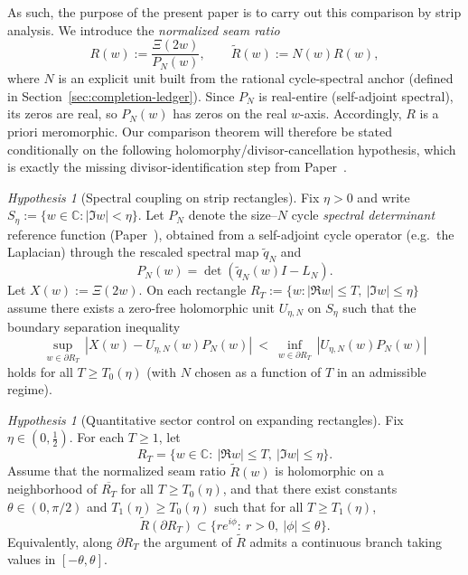 \documentclass[11pt]{amsart}
\theoremstyle{definition}
\theoremstyle{remark}
\newtheorem{hypothesis}[theorem]{Hypothesis}
\newcommand{\C}{\mathbb{C}}
\begin{document}
As such, the purpose of the present paper is to carry out this comparison by strip analysis.
We introduce the \emph{normalized seam ratio}
\[
R(w):=\frac{\Xi(2w)}{P_N(w)},
\qquad
\widetilde R(w):=N(w)R(w),
\]
where $N$ is an explicit unit built from the rational cycle-spectral anchor (defined in
Section~\ref{sec:completion-ledger}). Since $P_N$ is real-entire (self-adjoint spectral), its zeros are real,
so $P_N(w)$ has zeros on the real $w$-axis. Accordingly, $R$ is a priori meromorphic.
Our comparison theorem will therefore be stated conditionally on the following holomorphy/divisor-cancellation hypothesis, which is exactly the missing divisor-identification step from Paper~\cite{PaperI}.

\begin{hypothesis}[Spectral coupling on strip rectangles]\label{hyp:seam-holomorphy}
Fix $\eta>0$ and write $S_\eta:=\{w\in\C:|\Im w|<\eta\}$.  Let $P_N$ denote the size--$N$ cycle
\emph{spectral determinant} reference function (Paper~\cite{PaperI}), obtained from a self-adjoint
cycle operator (e.g.\ the Laplacian) through the rescaled spectral map $\widetilde q_N$ and
\[
P_N(w)=\det(\widetilde q_N(w)I-L_N).
\]
Let $X(w):=\Xi(2w)$.  On each rectangle $R_T:=\{w:|\Re w|\le T,\ |\Im w|\le \eta\}$ assume there exists
a zero-free holomorphic unit $U_{\eta,N}$ on $S_\eta$ such that the boundary separation inequality
\[
\sup_{w\in\partial R_T}\,|X(w)-U_{\eta,N}(w)P_N(w)|\ <\ \inf_{w\in\partial R_T}\,|U_{\eta,N}(w)P_N(w)|
\]
holds for all $T\ge T_0(\eta)$ (with $N$ chosen as a function of $T$ in an admissible regime).
\end{hypothesis}

\begin{hypothesis}[Quantitative sector control on expanding rectangles]\label{hyp:sector-control}
Fix $\eta\in(0,\tfrac12)$. For each $T\ge 1$, let
\[
R_T=\{w\in\C:\ |\Re w|\le T,\ |\Im w|\le \eta\}.
\]
Assume that the normalized seam ratio $\widetilde R(w)$ is holomorphic on a neighborhood of
$\overline{R_T}$ for all $T\ge T_0(\eta)$, and that there exist constants $\theta\in(0,\pi/2)$ and
$T_1(\eta)\ge T_0(\eta)$ such that for all $T\ge T_1(\eta)$,
\[
\widetilde R(\partial R_T)\subset \{re^{i\phi}:\ r>0,\ |\phi|\le \theta\}.
\]
Equivalently, along $\partial R_T$ the argument of $\widetilde R$ admits a continuous branch taking values
in $[-\theta,\theta]$.
\end{hypothesis}
\end{document}
